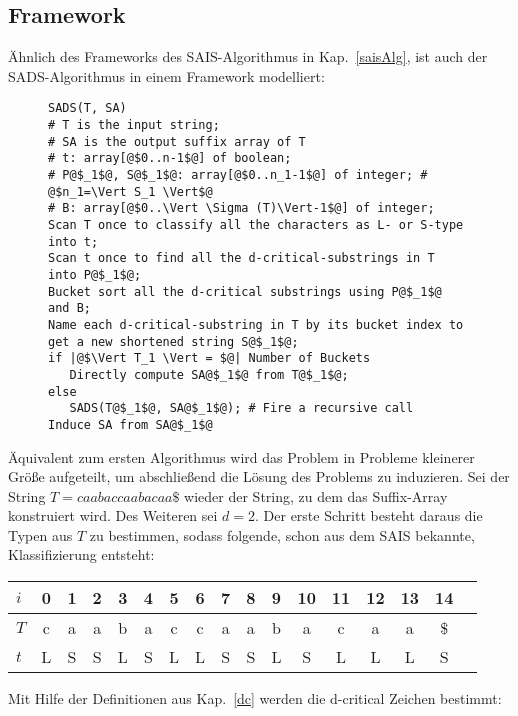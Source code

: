 \subsection{Framework}
Ähnlich des Frameworks des SAIS-Algorithmus in Kap.~\ref{saisAlg}, ist auch der SADS-Algorithmus in einem Framework\cite[fig.~3]{saca:6} modelliert:
\label{sadsAlg}
\begin{figure}
\begin{verbatim}
SADS(T, SA)
# T is the input string;
# SA is the output suffix array of T
# t: array[@$0..n-1$@] of boolean;
# P@$_1$@, S@$_1$@: array[@$0..n_1-1$@] of integer; # @$n_1=\Vert S_1 \Vert$@
# B: array[@$0..\Vert \Sigma (T)\Vert-1$@] of integer;
Scan T once to classify all the characters as L- or S-type
into t;
Scan t once to find all the d-critical-substrings in T
into P@$_1$@;
Bucket sort all the d-critical substrings using P@$_1$@
and B;
Name each d-critical-substring in T by its bucket index to
get a new shortened string S@$_1$@;
if |@$\Vert T_1 \Vert = $@| Number of Buckets
   Directly compute SA@$_1$@ from T@$_1$@;
else
   SADS(T@$_1$@, SA@$_1$@); # Fire a recursive call
Induce SA from SA@$_1$@
\end{verbatim}
\end{figure}


\noindent Äquivalent zum ersten Algorithmus wird das Problem in Probleme kleinerer Größe aufgeteilt, um abschließend die Lösung des Problems zu induzieren.
Sei der String $T = caabaccaabacaa\$$ wieder der String, zu dem das Suffix-Array konstruiert wird. Des Weiteren sei $d = 2$. Der erste Schritt besteht daraus die Typen aus $T$
zu bestimmen, sodass folgende, schon aus dem SAIS bekannte, Klassifizierung entsteht:

\begin{center}
  \begin{tabular}{ | l | c | c | c | c | c | c | c | c | c | c | c | c | c | c | c | c | }
    \hline
        $i$ & 0 & 1 & 2 & 3 & 4 & 5 & 6 & 7 & 8 & 9 & 10 & 11 & 12 & 13 & 14 \\ \hline
        $T$ & c & a & a & b & a & c & c & a & a & b & a & c & a & a & \$ \\ \hline
        $t$ & L & S & S & L & S & L & L & S & S & L & S & L & L & L & S \\
    \hline
  \end{tabular}
\end{center}
\bigskip

\newpage
\noindent Mit Hilfe der Definitionen aus Kap.~\ref{dc} werden die d-critical Zeichen bestimmt:

